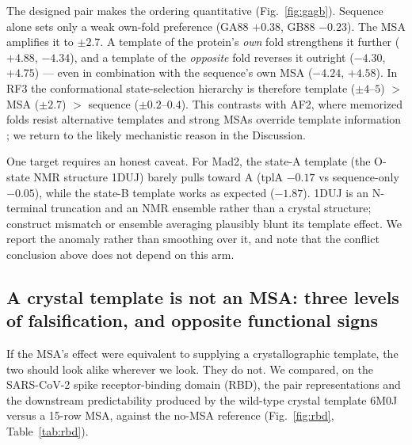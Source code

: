 \documentclass[11pt]{article}
\begin{document}
The designed pair makes the ordering quantitative
(Fig.~\ref{fig:gagb}). Sequence alone sets only a weak own-fold preference
(GA88 $+0.38$, GB88 $-0.23$). The MSA amplifies it to $\pm 2.7$. A template
of the protein's \emph{own} fold strengthens it further ($+4.88$, $-4.34$),
and a template of the \emph{opposite} fold reverses it outright
($-4.30$, $+4.75$) --- even in combination with the sequence's own MSA
($-4.24$, $+4.58$). In RF3 the conformational state-selection hierarchy is
therefore template ($\pm 4$--$5$) $>$ MSA ($\pm 2.7$) $>$ sequence
($\pm 0.2$--$0.4$). This contrasts with AF2, where memorized folds resist
alternative templates \cite{chakravarty2024} and strong MSAs override
template information \cite{kovalevskiy2024}; we return to the likely
mechanistic reason in the Discussion.

One target requires an honest caveat. For Mad2, the state-A template (the
O-state NMR structure 1DUJ) barely pulls toward A (tplA $-0.17$ vs
sequence-only $-0.05$), while the state-B template works as expected
($-1.87$). 1DUJ is an N-terminal truncation and an NMR ensemble rather than
a crystal structure; construct mismatch or ensemble averaging plausibly
blunt its template effect. We report the anomaly rather than smoothing over
it, and note that the conflict conclusion above does not depend on this arm.

\subsection{A crystal template is not an MSA: three levels of falsification,
and opposite functional signs}

If the MSA's effect were equivalent to supplying a crystallographic
template, the two should look alike wherever we look. They do not. We
compared, on the SARS-CoV-2 spike receptor-binding domain (RBD), the pair
representations and the downstream predictability produced by the wild-type
crystal template 6M0J \cite{lan2020} versus a 15-row MSA, against the no-MSA
reference (Fig.~\ref{fig:rbd}, Table~\ref{tab:rbd}).
\end{document}
